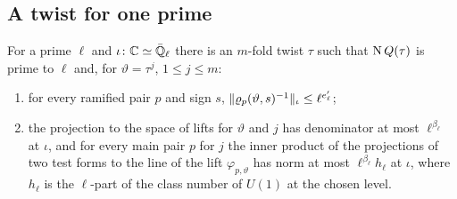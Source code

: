 \subsection{A twist for one prime}\label{ss:fit-one-prime}

\begin{theorem}\label{thm:fit-one-prime}
For a prime $\ell$ and $\iota\colon\mathbb{C}\simeq\bar{\mathbb{Q}}_\ell$ there is an $m$-fold twist $\tau$ such that $\operatorname{N} Q(\tau)$ is prime to $\ell$ and, for $\vartheta=\tau^j$, $1\le j\le m$:
\begin{enumerate}[label=\textup{(\alph*)}]
\item for every ramified pair $p$ and sign $s$, $\lVert \varrho_p(\vartheta,s)^{-1}\rVert_\iota\le\ell^{e'_\ell}$;
\item the projection to the space of lifts for $\vartheta$ and $j$ has denominator at most $\ell^{\beta_\ell}$ at $\iota$, and for every main pair $p$ for $j$ the inner product of the projections of two test forms to the line of
the lift $\varphi_{p,\vartheta}$ has norm at most $\ell^{\beta_\ell}h_\ell$ at $\iota$, where $h_\ell$ is the $\ell$-part of the class number of $U(1)$ at the chosen level.
\end{enumerate}
\end{theorem}


